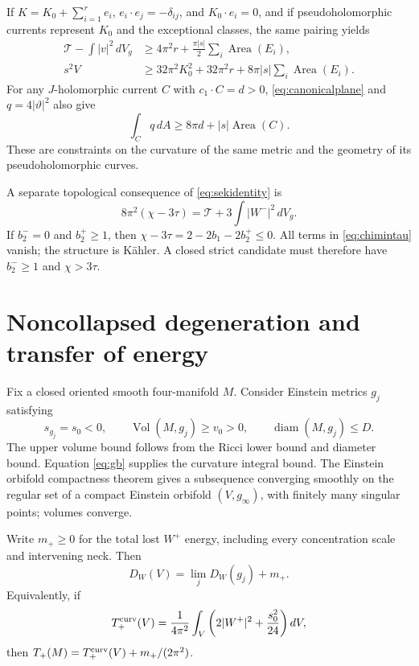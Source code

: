 \documentclass[11pt,a4paper]{article}
\theoremstyle{definition}
\theoremstyle{remark}
\newcommand{\Vol}{\operatorname{Vol}}
\newcommand{\dd}{\,dV_g}
\newcommand{\cT}{\mathcal T}
\begin{document}
If $K=K_0+\sum_{i=1}^r e_i$, $e_i\cdot e_j=-\delta_{ij}$, and $K_0\cdot e_i=0$, and if pseudoholomorphic currents represent $K_0$ and the exceptional classes, the same pairing yields
\begin{align}
 \cT-\int|v|^2\dd&\ge4\pi^2r+\frac{\pi|s|}{2}\sum_i\operatorname{Area}(E_i),\label{eq:excT}\\
 s^2V&\ge32\pi^2K_0^2+32\pi^2r+8\pi|s|\sum_i\operatorname{Area}(E_i).\label{eq:excaction}
\end{align}
For any $J$-holomorphic current $C$ with $c_1\cdot C=d>0$, \eqref{eq:canonicalplane} and $q=4|\vartheta|^2$ also give
\[
 \int_Cq\,dA\ge8\pi d+|s|\operatorname{Area}(C).
\]
These are constraints on the curvature of the same metric and the geometry of its pseudoholomorphic curves.

A separate topological consequence of \eqref{eq:sekidentity} is
\begin{equation}\label{eq:chimintau}
 8\pi^2(\chi-3\tau)=\cT+3\int|W^-|^2\dd.
\end{equation}
If $b_2^-=0$ and $b_2^+\ge1$, then $\chi-3\tau=2-2b_1-2b_2^+\le0$. All terms in \eqref{eq:chimintau} vanish; the structure is K\"ahler. A closed strict candidate must therefore have $b_2^-\ge1$ and $\chi>3\tau$.

\section{Noncollapsed degeneration and transfer of energy}
Fix a closed oriented smooth four-manifold $M$. Consider Einstein metrics $g_j$ satisfying
\begin{equation}\label{eq:noncollapse}
 s_{g_j}=s_0<0,\qquad \Vol(M,g_j)\ge v_0>0,\qquad
 \operatorname{diam}(M,g_j)\le D.
\end{equation}
The upper volume bound follows from the Ricci lower bound and diameter bound. Equation \eqref{eq:gb} supplies the curvature integral bound. The Einstein orbifold compactness theorem \cite{Anderson} gives a subsequence converging smoothly on the regular set of a compact Einstein orbifold $(V,g_\infty)$, with finitely many singular points; volumes converge.

Write $m_+\ge0$ for the total lost $W^+$ energy, including every concentration scale and intervening neck. Then
\begin{equation}\label{eq:DWlimit}
 D_W(V)=\lim_jD_W(g_j)+m_+.
\end{equation}
Equivalently, if
\[
 T_+^{\rm curv}(V)=\frac1{4\pi^2}\int_V\left(2|W^+|^2+\frac{s_0^2}{24}\right)dV,
\]
then $T_+(M)=T_+^{\rm curv}(V)+m_+/(2\pi^2)$.
\end{document}

